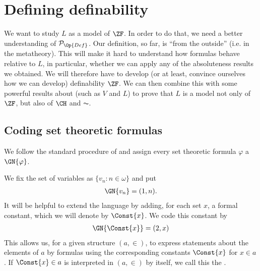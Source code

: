 \documentclass[letterpaper,10pt,english]{jupyterBook}
\begin{document}
\section{Defining definability}
\label{\detokenize{constructible:defining-definability}}
\sphinxAtStartPar
We want to study \(L\) as a model of \(\ZF\). In order to do that, we need a better understanding of \(\mathcal{P}_{\Op{Def}}\). Our definition, so far, is “from the outside” (i.e. in the meta\sphinxhyphen{}theory). This will make it hard to understand how formulas behave relative to \(L\), in particular, whether we can apply any of the absoluteness results we obtained. We will therefore have to develop (or at least, convince ourselves how we can develop) definability   \(\ZF\). We can then combine this with some powerful results about  (such as \(V\) and \(L\)) to prove that \(L\) is a model not only of \(\ZF\), but also of \(\CH\) and \(\AC\).


\subsection{Coding set theoretic formulas}
\label{\detokenize{constructible:coding-set-theoretic-formulas}}
\sphinxAtStartPar
We follow the standard procedure of  and assign every set theoretic formula \(\varphi\) a  \(\GN{\varphi}\).

\sphinxAtStartPar
We fix the set of variables as \(\{v_n: n \in \omega\}\) and put
\begin{equation*}
\begin{split}
\GN{v_n} = (1,n).
\end{split}
\end{equation*}
\sphinxAtStartPar
It will be helpful to extend the language by adding, for each set \(x\), a formal constant, which we will denote by \(\Const{x}\). We code this constant by
\begin{equation*}
\begin{split}
\GN{\Const{x}} = (2,x)
\end{split}
\end{equation*}
\sphinxAtStartPar
This allows us, for a given structure \((a,\in)\), to express statements about the elements of \(a\) by formulas using the corresponding constants \(\Const{x}\) for \(x \in a\). If \(\Const{x} \in a\) is interpreted in \((a,\in)\) by itself, we call this the .
\end{document}
